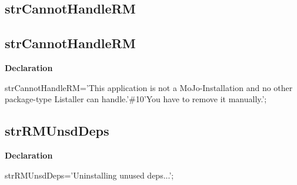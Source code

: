 \documentclass{report}
\newif\ifpdf
\begin{document}
\subsection*{\large{\textbf{strCannotHandleRM}}\normalsize\hspace{1ex}\hrulefill}
\else
\subsection*{strCannotHandleRM}
\fi
\label{trstrings-strCannotHandleRM}
\begin{list}{}{
\setlength{\itemindent}{0cm}
\setlength{\listparindent}{0cm}
\setlength{\leftmargin}{\evensidemargin}
\addtolength{\leftmargin}{\tmplength}
\settowidth{\labelsep}{X}
\addtolength{\leftmargin}{\labelsep}
\setlength{\labelwidth}{\tmplength}
}
\item[\textbf{Declaration}\hfill]
\ifpdf
\begin{flushleft}
\fi
\begin{ttfamily}
strCannotHandleRM='This application is not a MoJo-Installation and no other package-type Listaller can handle.'{\#}10'You have to remove it manually.';\end{ttfamily}

\ifpdf
\end{flushleft}
\fi

\end{list}
\ifpdf
\subsection*{\large{\textbf{strRMUnsdDeps}}\normalsize\hspace{1ex}\hrulefill}
\else
\subsection*{strRMUnsdDeps}
\fi
\label{trstrings-strRMUnsdDeps}
\begin{list}{}{
\setlength{\itemindent}{0cm}
\setlength{\listparindent}{0cm}
\setlength{\leftmargin}{\evensidemargin}
\addtolength{\leftmargin}{\tmplength}
\settowidth{\labelsep}{X}
\addtolength{\leftmargin}{\labelsep}
\setlength{\labelwidth}{\tmplength}
}
\item[\textbf{Declaration}\hfill]
\ifpdf
\begin{flushleft}
\fi
\begin{ttfamily}
strRMUnsdDeps='Uninstalling unused deps...';\end{ttfamily}

\ifpdf
\end{flushleft}
\fi

\end{list}
\ifpdf
\end{document}
